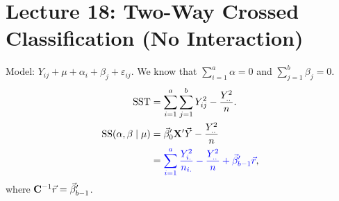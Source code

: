 \section{Lecture 18: Two-Way Crossed Classification (No Interaction)}
Model: $ Y_{ij}+\mu+\alpha_i+\beta_j+\varepsilon_{ij} $. We know that
$ \sum_{i=1}^{a}\alpha=0 $ and $ \sum_{j=1}^{b}\beta_j=0 $.
\begin{align*}
    \text{SST}
     & =\sum_{i=1}^{a}\sum_{j=1}^{b}Y_{ij}^2-\frac{Y_{..}^2}{n}.                  \\
    \text{SS}(\alpha,\beta\mid \mu)
     & =\vec{\beta}_0'\mathbf{X}'\vec{Y}-\frac{Y_{..}^2}{n}                 \\
     & =\textcolor{blue}{\sum_{i=1}^{a}\frac{Y_{i.}^2}{n_{i.}}-\frac{Y_{..}^2}{n}
        +\vec{\beta}_{b-1}'\vec{r}},
\end{align*}
where $ \mathbf{C}^{-1}\vec{r}=\vec{\beta}_{b-1}' $.
